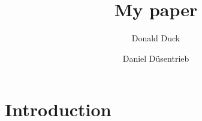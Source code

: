 \documentclass[12pt,ngerman]{article}
\begin{document}
\title{My paper}
\author[*]{Donald Duck}
\author[*,**]{Daniel Düsentrieb}


\maketitle

\begin{abstract}
\blindtext
\end{abstract}

\section{Introduction}

\blindtext
\end{document}
